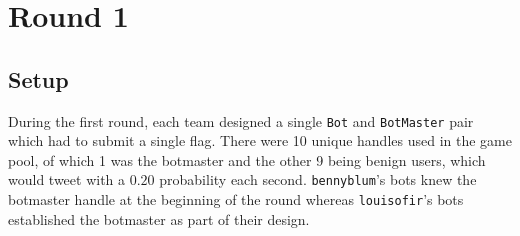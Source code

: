 \documentclass[11pt, oneside]{article} %
\numberwithin{equation}{section} %
\numberwithin{figure}{section} %
\numberwithin{table}{section} %
\renewcommand{\c}[1]{\texttt{#1}}
\newcommand{\teambb}{\c{bennyblum}}
\newcommand{\teamol}{\c{louisofir}}
\begin{document}



	

\section{Round 1}
	\subsection{Setup}
		During the first round, each team designed a single \c{Bot} and \c{BotMaster} pair which had to submit a single flag. There were 10 unique handles used in the game pool, of which 1 was the botmaster and the other 9 being benign users, which would tweet with a $0.20$ probability each second. \teambb{}'s bots knew the botmaster handle at the beginning of the round whereas \teamol{}'s bots established the botmaster as part of their design. \\
\end{document}
